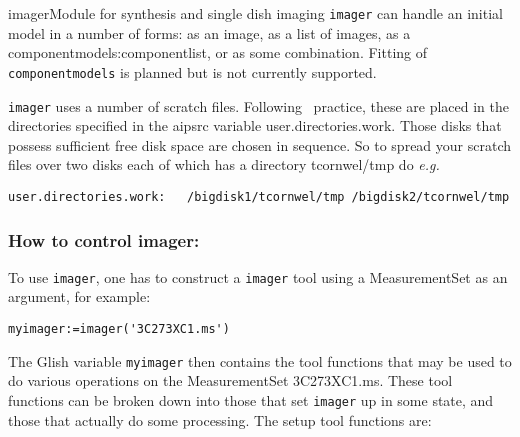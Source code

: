 \begin{ahmodule}{imager}{Module for synthesis and single dish imaging}
{\tt imager} can handle an initial model in a number of forms: as an
image, as a list of images, as a 
{componentmodels:componentlist}, or as some combination. Fitting of
{\tt componentmodels} is planned but is not currently supported.

{\tt imager} uses a number of scratch files. Following \aipspp\
practice, these are placed in the directories specified in the
aipsrc variable user.directories.work.
Those disks that possess sufficient free disk space are
chosen in sequence. So to spread your scratch files over
two disks each of which has a directory tcornwel/tmp do {\em
e.g.}

\begin{verbatim}
user.directories.work:   /bigdisk1/tcornwel/tmp /bigdisk2/tcornwel/tmp
\end{verbatim}

\subsubsection*{How to control imager:}

To use {\tt imager}, one has to construct a {\tt imager} tool using
a MeasurementSet as an argument, for example:

\begin{verbatim}
myimager:=imager('3C273XC1.ms')
\end{verbatim}

The Glish variable {\tt myimager} then contains the tool functions
that may be used to do various operations on the MeasurementSet
3C273XC1.ms. These tool functions can be broken down into those that
set {\tt imager} up in some state, and those that actually do some
processing. The setup tool functions are: 


\end{ahmodule}
